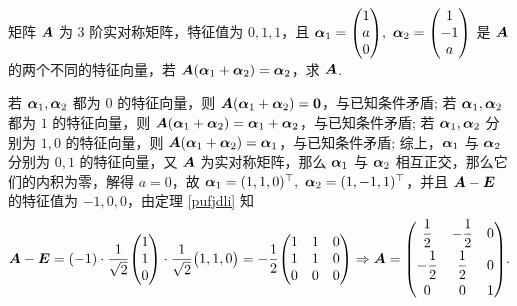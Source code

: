 \begin{example}
    矩阵 $\vb*{A}$ 为 3 阶实对称矩阵，特征值为 $0,1,1$，且 $\vb*{\alpha}_1=\mqty(1\\a\\0),~\vb*{\alpha}_2=\mqty(1\\-1\\a)$ 是 $\vb*{A}$ 的两个不同的特征向量，若 $\vb*{A}(\vb*{\alpha}_1+\vb*{\alpha}_2)=\vb*{\alpha}_2$，求 $\vb*{A}$.
\end{example}
\begin{solution}
    若 $\vb*{\alpha}_1,\vb*{\alpha}_2$ 都为 $0$ 的特征向量，则 $\vb*{A}(\vb*{\alpha}_1+\vb*{\alpha}_2)=\vb*{0}$，与已知条件矛盾;
    若 $\vb*{\alpha}_1,\vb*{\alpha}_2$ 都为 $1$ 的特征向量，则 $\vb*{A}(\vb*{\alpha}_1+\vb*{\alpha}_2)=\vb*{\alpha}_1+\vb*{\alpha}_2$，与已知条件矛盾;
    若 $\vb*{\alpha}_1,\vb*{\alpha}_2$ 分别为 $1,0$ 的特征向量，则 $\vb*{A}(\vb*{\alpha}_1+\vb*{\alpha}_2)=\vb*{\alpha}_1$，与已知条件矛盾;
    综上，$\vb*{\alpha}_1$ 与 $\vb*{\alpha}_2$ 分别为 $0,1$ 的特征向量，又 $\vb*{A}$ 为实对称矩阵，那么 $\vb*{\alpha}_1$ 与 $\vb*{\alpha}_2$ 相互正交，那么它们的内积为零，解得 $a=0$，故
    $\vb*{\alpha}_1=(1,1,0)^\top,~\vb*{\alpha}_2=(1,-1,1)^\top$，并且 $\vb*{A}-\vb*{E}$ 的特征值为 $-1,0,0$，由定理 \ref{pufjdli} 知
    $$\vb*{A}-\vb*{E}=(-1)\cdot\dfrac{1}{\sqrt{2}}\mqty(1\\1\\0)\cdot\dfrac{1}{\sqrt{2}}\mqty(1,1,0)=-\dfrac{1}{2}\mqty(1&1&0\\1&1&0\\0&0&0)\Rightarrow \vb*{A}=\mqty(\dfrac{1}{2}&-\dfrac{1}{2}&0\\[6pt]-\dfrac{1}{2}&\dfrac{1}{2}&0\\[6pt]0&0&1).$$
\end{solution}


